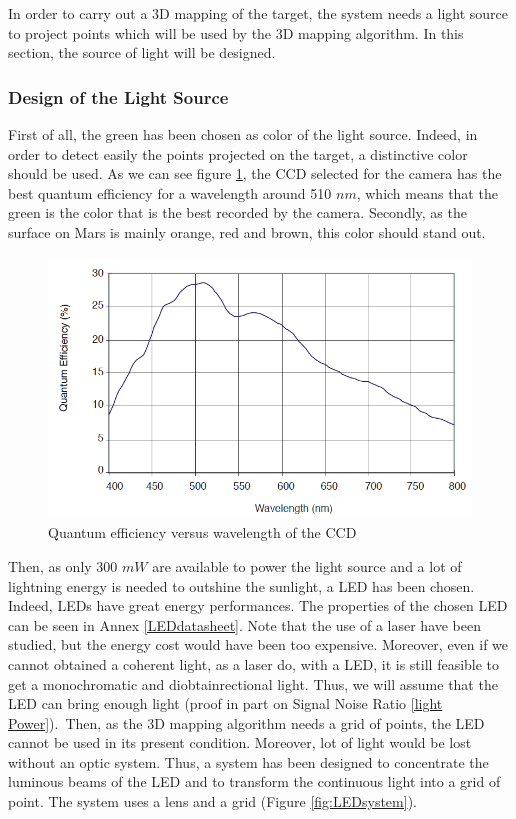 In order to carry out a 3D mapping of the target, the system needs a light source to project points which will be used by the 3D mapping algorithm. In this section, the source of light will be designed.

\subsubsection{Design of the Light Source}
First of all, the green has been chosen as color of the light source. Indeed, in order to detect easily the points projected on the target, a distinctive color should be used. As we can see figure \ref{fig:QeCCD}, the CCD selected for the camera has the best quantum efficiency for a wavelength around 510 $nm$, which means that the green is the color that is the best recorded by the camera. Secondly, as the surface on Mars is mainly orange, red and brown, this color should stand out.


\begin{figure}[h]
  \centerline{\includegraphics[scale=0.6]{fig/QeCCD.png}}
  \caption{Quantum efficiency versus wavelength of the CCD}
  \label{fig:QeCCD}
\end{figure}

Then, as only 300 $mW$ are available to power the light source and a lot of lightning energy is needed to outshine the sunlight, a LED has been chosen. Indeed, LEDs have great energy performances. The properties of the chosen LED can be seen in Annex \ref{LEDdatasheet}. Note that the use of a laser have been studied, but the energy cost would have been too expensive. Moreover, even if we cannot obtained a coherent light, as a laser do, with a LED, it is still feasible to get a monochromatic and diobtainrectional light. Thus, we will assume that the LED can bring enough light (proof in part on Signal Noise Ratio \ref{light Power}).\
Then, as the 3D mapping algorithm needs a grid of points, the LED cannot be used in its present condition. Moreover, lot of light would be lost without an optic system. Thus, a system has been designed to concentrate the luminous beams of the LED and to transform the continuous light into a grid of point. The system uses a lens and a grid (Figure \ref{fig:LEDsystem}). 

